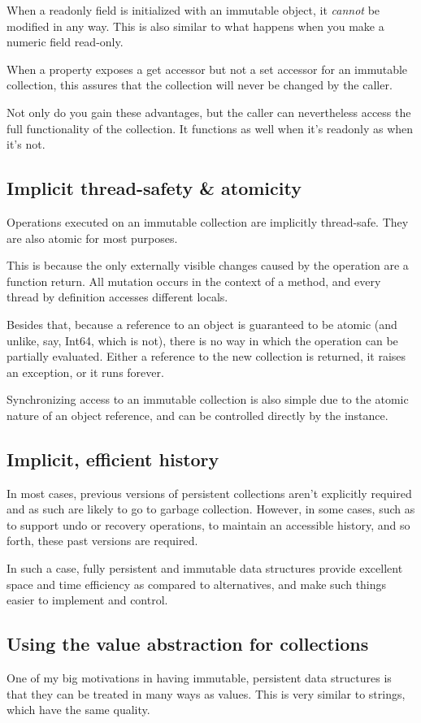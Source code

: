 \documentclass[]{article}
\newcommand{\codeformat}{\ttfamily}
\newcommand{\classformat}{\codeformat\color{olive}}
\newcommand{\keywordformat}{\codeformat\color{blue}}
\newcommand{\keyword}[1]{{\keywordformat #1}}
\newcommand{\class}[1]{{\classformat #1}}
\begin{document}
When a \keyword{readonly} field is initialized with an immutable object, it \emph{cannot} be modified in any way. This is also similar to what happens when you make a numeric field read-only. 

When a property exposes a \keyword{get} accessor but not a \keyword{set} accessor for an immutable collection, this assures that the collection will never be changed by the caller.

Not only do you gain these advantages, but the caller can nevertheless access the full functionality of the collection. It functions as well when it's readonly as when it's not.

\subsection{Implicit thread-safety \& atomicity}
Operations executed on an immutable collection are implicitly thread-safe. They are also atomic for most purposes.

This is because the only externally visible changes caused by the operation are a function return. All mutation occurs in the context of a method, and every thread by definition accesses different locals.

Besides that, because a reference to an object is guaranteed to be atomic (and unlike, say, \class{Int64}, which is not), there is no way in which the operation can be partially evaluated. Either a reference to the new collection is returned, it raises an exception, or it runs forever.

Synchronizing access to an immutable collection is also simple due to the atomic nature of an object reference, and can be controlled directly by the instance.

\subsection{Implicit, efficient history}
In most cases, previous versions of persistent collections aren't explicitly required and as such are likely to go to garbage collection. However, in some cases, such as to support undo or recovery operations, to maintain an accessible history, and so forth, these past versions are required.

In such a case, fully persistent and immutable data structures provide excellent space and time efficiency as compared to alternatives, and make such things easier to implement and control. 

\subsection{Using the value abstraction for collections}
One of my big motivations in having immutable, persistent data structures is that they can be treated in many ways as values. This is very similar to strings, which have the same quality.
\end{document}
